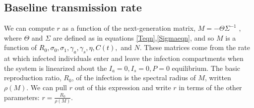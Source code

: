 \subsection{Baseline transmission rate} 

We can compute $r$ as a function of the next-generation matrix, $M = - \Theta \Sigma ^{-1}$  \cite{diekmann2010construction}, where $\Theta$ and $\Sigma$ are defined as in equations \ref{Teqn},\ref{Sigmaeqn}, and so $M$ is a function of \textcolor{black}{ $R_0, \sigma_0,\sigma_1, \gamma_a, \gamma_s, \eta, C(t),$} and $N$. These matrices come from the rate at which infected individuals enter and leave the  infection compartments when the system is linearized about the $I_a = 0, I_s = 0, P = 0$ equilibrium. The basic reproduction ratio, $R_0$, of the infection is the spectral radius of $M$, written $\rho(M)$. We can pull $r$ out of this expression and write $r$ in terms of the other parameters: $r = \frac{R_0}{\rho(M)}$.
\footnotesize
